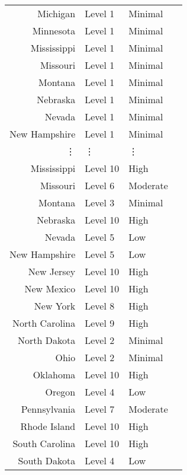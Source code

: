 \documentclass[11pt]{article}
\begin{document}
\begin{tabular}{r|lll}
	 Michigan             & Level 1              & Minimal             \\
	 Minnesota            & Level 1              & Minimal             \\
	 Mississippi          & Level 1              & Minimal             \\
	 Missouri             & Level 1              & Minimal             \\
	 Montana              & Level 1              & Minimal             \\
	 Nebraska             & Level 1              & Minimal             \\
	 Nevada               & Level 1              & Minimal             \\
	 New Hampshire        & Level 1              & Minimal             \\
	 ⋮ & ⋮ & ⋮\\
	 Mississippi    & Level 10       & High          \\
	 Missouri       & Level 6        & Moderate      \\
	 Montana        & Level 3        & Minimal       \\
	 Nebraska       & Level 10       & High          \\
	 Nevada         & Level 5        & Low           \\
	 New Hampshire  & Level 5        & Low           \\
	 New Jersey     & Level 10       & High          \\
	 New Mexico     & Level 10       & High          \\
	 New York       & Level 8        & High          \\
	 North Carolina & Level 9        & High          \\
	 North Dakota   & Level 2        & Minimal       \\
	 Ohio           & Level 2        & Minimal       \\
	 Oklahoma       & Level 10       & High          \\
	 Oregon         & Level 4        & Low           \\
	 Pennsylvania   & Level 7        & Moderate      \\
	 Rhode Island   & Level 10       & High          \\
	 South Carolina & Level 10       & High          \\
	 South Dakota   & Level 4        & Low           \\

\end{tabular}
\end{document}
